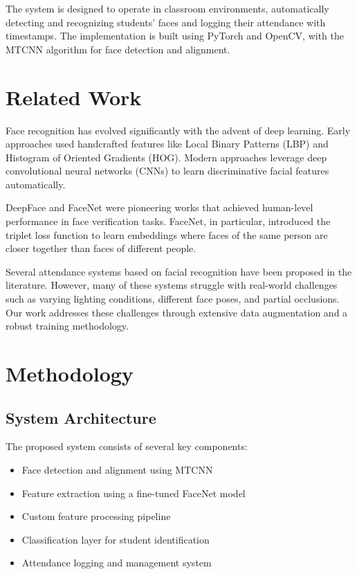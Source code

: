 \documentclass[conference]{IEEEtran}
\begin{document}
The system is designed to operate in classroom environments, automatically detecting and recognizing students' faces and logging their attendance with timestamps. The implementation is built using PyTorch and OpenCV, with the MTCNN algorithm for face detection and alignment.

\section{Related Work}
Face recognition has evolved significantly with the advent of deep learning. Early approaches used handcrafted features like Local Binary Patterns (LBP) and Histogram of Oriented Gradients (HOG). Modern approaches leverage deep convolutional neural networks (CNNs) to learn discriminative facial features automatically.

DeepFace \cite{b1} and FaceNet \cite{b2} were pioneering works that achieved human-level performance in face verification tasks. FaceNet, in particular, introduced the triplet loss function to learn embeddings where faces of the same person are closer together than faces of different people.

Several attendance systems based on facial recognition have been proposed in the literature. However, many of these systems struggle with real-world challenges such as varying lighting conditions, different face poses, and partial occlusions. Our work addresses these challenges through extensive data augmentation and a robust training methodology.

\section{Methodology}
\subsection{System Architecture}
The proposed system consists of several key components:

\begin{itemize}
\item Face detection and alignment using MTCNN
\item Feature extraction using a fine-tuned FaceNet model
\item Custom feature processing pipeline
\item Classification layer for student identification
\item Attendance logging and management system
\end{itemize}
\end{document}

